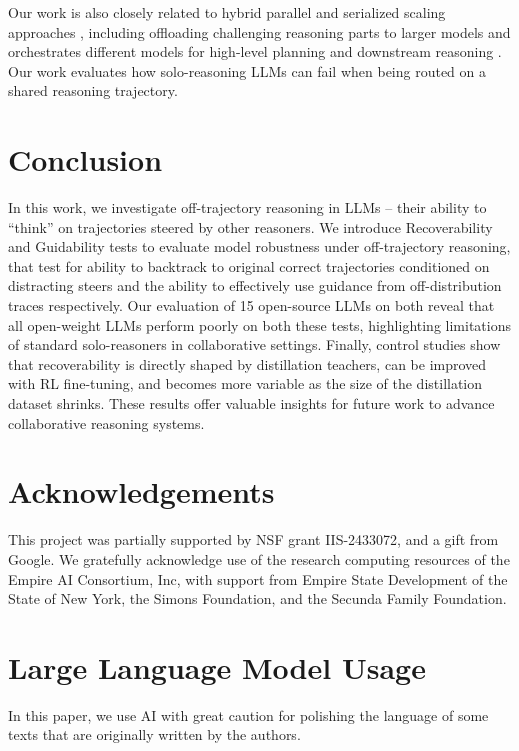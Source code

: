 \documentclass{article} %
\begin{document}
Our work is also closely related to hybrid parallel and serialized scaling approaches \citep{pan2025learning}, including offloading  challenging reasoning parts to larger models \cite{akhauri2025splitreason} and orchestrates different models for high-level planning and downstream reasoning \cite{lee2025collaborative}. Our work evaluates how solo-reasoning LLMs can fail when being routed on a shared reasoning trajectory.

\section{Conclusion}
In this work, we investigate off-trajectory reasoning in LLMs -- their ability to ``think'' on trajectories steered by other reasoners. We introduce Recoverability and Guidability tests to evaluate model robustness under off-trajectory reasoning, that test for ability to backtrack to original correct trajectories conditioned on distracting steers and the ability to effectively use guidance from off-distribution traces respectively. Our evaluation of 15 open-source LLMs on both reveal that all open-weight LLMs perform poorly on both these tests, highlighting limitations of standard solo-reasoners in collaborative settings. Finally, control studies show that recoverability is directly shaped by distillation teachers, can be improved with RL fine-tuning, and becomes more variable as the size of the distillation dataset shrinks. These results offer valuable insights for future work to advance collaborative reasoning systems.

\section{Acknowledgements}
This project was partially supported by NSF grant IIS-2433072, and a gift from Google. We gratefully acknowledge use of the research computing resources of the Empire AI Consortium, Inc, with support from Empire State Development of the State of New York, the Simons Foundation, and the Secunda Family Foundation.





\newpage    
\appendix

\section{Large Language Model Usage}
In this paper, we use AI  with great caution for polishing the language of some texts that are originally written by the authors.
\end{document}
